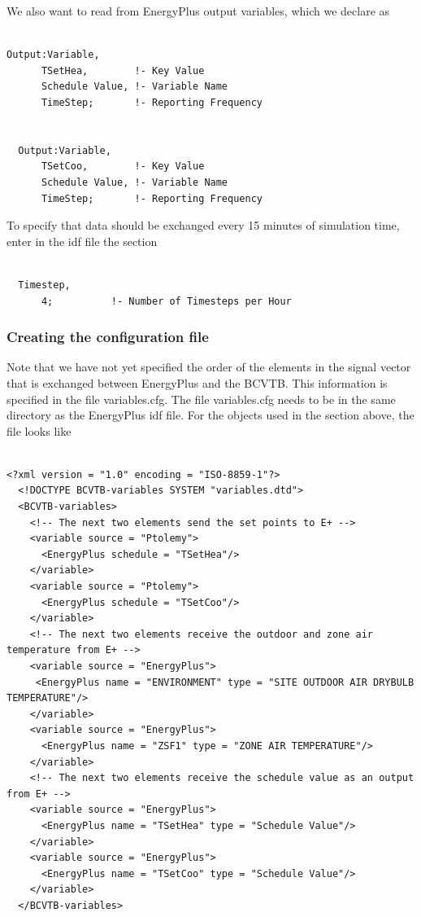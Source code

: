We also want to read from EnergyPlus output variables, which we declare as

\begin{lstlisting}

Output:Variable,
      TSetHea,        !- Key Value
      Schedule Value, !- Variable Name
      TimeStep;       !- Reporting Frequency


  Output:Variable,
      TSetCoo,        !- Key Value
      Schedule Value, !- Variable Name
      TimeStep;       !- Reporting Frequency
\end{lstlisting}

To specify that data should be exchanged every 15 minutes of simulation time, enter in the idf file the section

\begin{lstlisting}

  Timestep,
      4;          !- Number of Timesteps per Hour
\end{lstlisting}

\subsubsection{Creating the configuration file}\label{creating-the-configuration-file}

Note that we have not yet specified the order of the elements in the signal vector that is exchanged between EnergyPlus and the BCVTB. This information is specified in the file variables.cfg. The file variables.cfg needs to be in the same directory as the EnergyPlus idf file. For the objects used in the section above, the file looks like

\begin{lstlisting}

<?xml version = "1.0" encoding = "ISO-8859-1"?>
  <!DOCTYPE BCVTB-variables SYSTEM "variables.dtd">
  <BCVTB-variables>
    <!-- The next two elements send the set points to E+ -->
    <variable source = "Ptolemy">
      <EnergyPlus schedule = "TSetHea"/>
    </variable>
    <variable source = "Ptolemy">
      <EnergyPlus schedule = "TSetCoo"/>
    </variable>
    <!-- The next two elements receive the outdoor and zone air temperature from E+ -->
    <variable source = "EnergyPlus">
     <EnergyPlus name = "ENVIRONMENT" type = "SITE OUTDOOR AIR DRYBULB TEMPERATURE"/>
    </variable>
    <variable source = "EnergyPlus">
      <EnergyPlus name = "ZSF1" type = "ZONE AIR TEMPERATURE"/>
    </variable>
    <!-- The next two elements receive the schedule value as an output from E+ -->
    <variable source = "EnergyPlus">
      <EnergyPlus name = "TSetHea" type = "Schedule Value"/>
    </variable>
    <variable source = "EnergyPlus">
      <EnergyPlus name = "TSetCoo" type = "Schedule Value"/>
    </variable>
  </BCVTB-variables>
\end{lstlisting}

